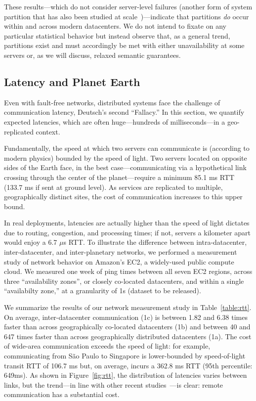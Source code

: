 These results---which do not consider server-level failures (another
form of system partition that has also been studied at
scale~\cite{google-availability})---indicate that partitions
\textit{do} occur within and across modern datacenters. We do not
intend to fixate on any particular statistical behavior but instead
observe that, as a general trend, partitions exist and must
accordingly be met with either unavailability at some servers or, as
we will discuss, relaxed semantic guarantees.

\subsection{Latency and Planet Earth}

Even with fault-free networks, distributed systems face the challenge
of communication latency, Deutsch's second ``Fallacy.'' In this
section, we quantify expected latencies, which are often
huge---hundreds of milliseconds---in a geo-replicated context.

Fundamentally, the speed at which two servers can communicate is
(according to modern physics) bounded by the speed of light. Two
servers located on opposite sides of the Earth face, in the best
case---communicating via a hypothetical link crossing through the
center of the planet---require a minimum 85.1 ms RTT (133.7 ms if sent
at ground level). As services are replicated to multiple,
geographically distinct sites, the cost of communication increases to
this upper bound.

In real deployments, latencies are actually higher than the speed of
light dictates due to routing, congestion, and processing times; if
not, servers a kilometer apart would enjoy a 6.7 $\mu$s RTT. To
illustrate the difference between intra-datacenter, inter-datacenter,
and inter-planetary networks, we performed a measurement study of
network behavior on Amazon's EC2, a widely-used public compute
cloud. We measured one week of ping times between all seven EC2
regions, across three ``availability zones'', or closely co-located
datacenters, and within a single ``availabilty zone,'' at a
granularity of 1s (dataset to be released).

We summarize the results of our network measurement study in
Table~\ref{table:rtt}. On average, inter-datacenter communication (1c)
is between 1.82 and 6.38 times faster than across geographically
co-located datacenters (1b) and between 40 and 647 times faster than
across geographically distributed datacenters (1a). The cost of
wide-area communication exceeds the speed of light: for example,
communicating from S\~{a}o Paulo to Singapore is lower-bounded by
speed-of-light transit RTT of 106.7 ms but, on average, incurs a 362.8
ms RTT (95th percentile: 649ms). As shown in Figure~\ref{fig:rtt}, the
distribution of latencies varies between links, but the trend---in
line with other recent studies~\cite{mdcc, redblue}---is clear: remote
communication has a substantial cost.

